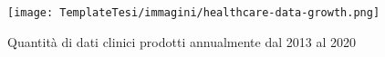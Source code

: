 \begin{figure}[h]
    \centering
    \texttt{[image: TemplateTesi/immagini/healthcare-data-growth.png]}
    
    \caption{Quantità di dati clinici prodotti annualmente dal 2013 al 2020 \cite{crescitadaticlinici}}
    \label{fig:my_label}
\end{figure}
%
